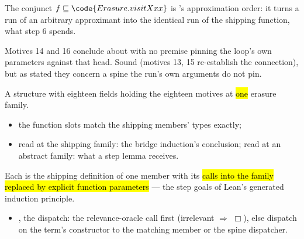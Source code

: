 \begin{remark}
 The conjunct $f \sqsubseteq \code{Erasure.visitXxx}$ is 's
approximation order: it turns a run of an arbitrary approximant into the identical run of the shipping
function, what step 6 spends.
\end{remark}

\begin{remark}
 Motives 14 and 16 conclude about  with no premise
pinning the loop's own parameters against that head. Sound (motives 13, 15 re-establish the connection),
but as stated they concern a spine the run's own arguments do not pin.
\end{remark}

\begin{definition}
\label{def:Motives}
\leanok
{}
 A structure with eighteen fields holding the eighteen motives at \hl{one} erasure family.
\begin{itemize}
\item the function slots match the shipping members' types exactly;
\item read at the shipping family: the bridge induction's conclusion; read at an abstract family: what a
step lemma receives.
\end{itemize}
\end{definition}

\begin{definition}
\label{def:visitExprBody}
\leanok
{}
 Each is the shipping definition of one member with its \hl{calls into the family
replaced by explicit function parameters} --- the step goals of Lean's generated induction principle.
\begin{itemize}
\item {}, the dispatch: the relevance-oracle call first (irrelevant $\Rightarrow$
$\Box$), else dispatch on the term's constructor to the matching member or the spine dispatcher.
\end{itemize}
\end{definition}

